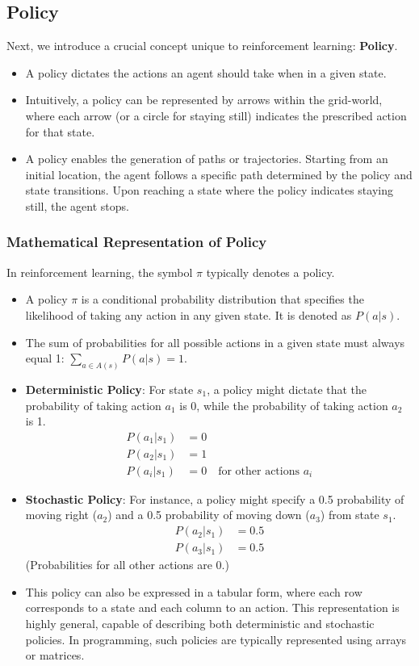 \documentclass{article}
\begin{document}
\subsection*{Policy}
Next, we introduce a crucial concept unique to reinforcement learning: \textbf{Policy}.
\begin{itemize}[noitemsep]
    \item A policy dictates the actions an agent should take when in a given state.
    \item Intuitively, a policy can be represented by arrows within the grid-world, where each arrow (or a circle for staying still) indicates the prescribed action for that state.
    \item A policy enables the generation of paths or trajectories. Starting from an initial location, the agent follows a specific path determined by the policy and state transitions. Upon reaching a state where the policy indicates staying still, the agent stops.
\end{itemize}

\subsubsection*{Mathematical Representation of Policy}
In reinforcement learning, the symbol $\pi$ typically denotes a policy.
\begin{itemize}[noitemsep]
    \item A policy $\pi$ is a conditional probability distribution that specifies the likelihood of taking any action in any given state. It is denoted as $P(a | s)$.
    \item The sum of probabilities for all possible actions in a given state must always equal 1: $\sum_{a \in A(s)} P(a | s) = 1$.
    \item \textbf{Deterministic Policy}: For state $s_1$, a policy might dictate that the probability of taking action $a_1$ is 0, while the probability of taking action $a_2$ is 1.
        \begin{align*}
            P(a_1 | s_1) &= 0 \\
            P(a_2 | s_1) &= 1 \\
            P(a_i | s_1) &= 0 \quad \text{for other actions } a_i
        \end{align*}
    \item \textbf{Stochastic Policy}: For instance, a policy might specify a 0.5 probability of moving right ($a_2$) and a 0.5 probability of moving down ($a_3$) from state $s_1$.
        \begin{align*}
            P(a_2 | s_1) &= 0.5 \\
            P(a_3 | s_1) &= 0.5
        \end{align*}
        (Probabilities for all other actions are 0.)
    \item This policy can also be expressed in a tabular form, where each row corresponds to a state and each column to an action. This representation is highly general, capable of describing both deterministic and stochastic policies. In programming, such policies are typically represented using arrays or matrices.
\end{itemize}
\end{document}
